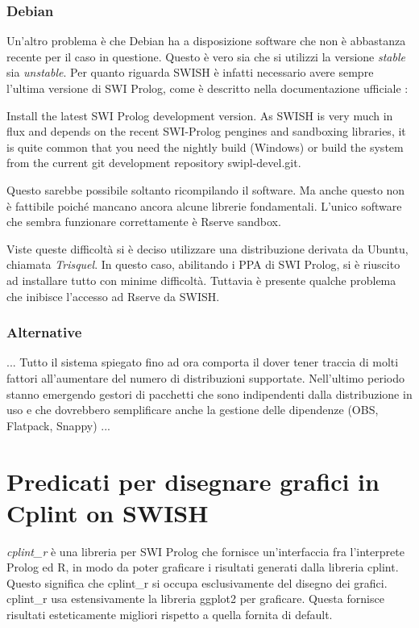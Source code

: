 \documentclass[10pt,titlepage,twoside,a4paper]{report}
\begin{document}
\subsection{Debian}
Un'altro problema è che Debian ha a disposizione software che non è
abbastanza recente per il caso in questione. Questo è vero sia che si 
utilizzi la versione \emph{stable} sia \emph{unstable}. Per quanto riguarda 
SWISH è infatti necessario avere sempre l'ultima versione di SWI Prolog,
come è descritto nella documentazione ufficiale \cite{lastestSWIProlog}:
\begin{displayquote}
Install the latest  SWI Prolog development version. As SWISH is very much in 
flux and depends on the recent SWI-Prolog pengines and sandboxing libraries, 
it is quite common that you need the nightly build (Windows) or build the 
system from the current git development repository swipl-devel.git.
\end{displayquote}

Questo sarebbe possibile  soltanto ricompilando il software. Ma anche questo 
non è fattibile poiché mancano ancora alcune librerie fondamentali. L'unico 
software che sembra funzionare correttamente è Rserve sandbox.

Viste queste difficoltà si è deciso utilizzare una distribuzione derivata 
da Ubuntu, chiamata \emph{Trisquel}. In questo caso, abilitando i PPA di SWI 
Prolog\cite{SWIPrologPPA}, si è riuscito ad installare tutto con minime 
difficoltà. Tuttavia è presente qualche problema che inibisce l'accesso ad 
Rserve da SWISH.

\subsection{Alternative}
... Tutto il sistema spiegato fino ad ora comporta il dover tener traccia di 
molti fattori all'aumentare del numero di distribuzioni supportate. Nell'ultimo 
periodo stanno emergendo gestori di pacchetti che sono indipendenti dalla 
distribuzione in uso e che dovrebbero semplificare anche la gestione delle 
dipendenze (OBS, Flatpack, Snappy) ...




\chapter{Predicati per disegnare grafici in Cplint on SWISH} 
\label{predicati-per-disegnare-grafici-in-cplint-on-swish}
\emph{cplint\_r} è una libreria per SWI Prolog che fornisce un'interfaccia 
fra l'interprete Prolog ed R, in modo da poter graficare i risultati generati 
dalla libreria cplint. Questo significa che cplint\_r si occupa esclusivamente 
del disegno dei grafici. cplint\_r usa estensivamente la libreria ggplot2 per 
graficare. Questa fornisce risultati esteticamente migliori rispetto a quella 
fornita di default.
\end{document}
